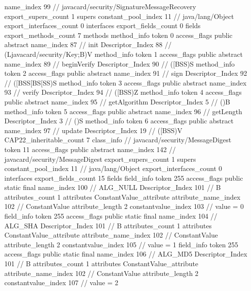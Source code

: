 {{{			name_index	99		// javacard/security/SignatureMessageRecovery
			export_supers_count	1
			supers {
				constant_pool_index	11		// java/lang/Object
			}
			export_interfaces_count	0
			interfaces {
			}
			export_fields_count	0
			fields {
			}
			export_methods_count	7
			methods {
				method_info {
					token	0
					access_flags	public abstract
					name_index	87		// init
					Descriptor_Index	88		// (Ljavacard/security/Key;B)V
				}
				method_info {
					token	1
					access_flags	public abstract
					name_index	89		// beginVerify
					Descriptor_Index	90		// ([BSS)S
				}
				method_info {
					token	2
					access_flags	public abstract
					name_index	91		// sign
					Descriptor_Index	92		// ([BSS[BS[SS)S
				}
				method_info {
					token	3
					access_flags	public abstract
					name_index	93		// verify
					Descriptor_Index	94		// ([BSS)Z
				}
				method_info {
					token	4
					access_flags	public abstract
					name_index	95		// getAlgorithm
					Descriptor_Index	5		// ()B
				}
				method_info {
					token	5
					access_flags	public abstract
					name_index	96		// getLength
					Descriptor_Index	3		// ()S
				}
				method_info {
					token	6
					access_flags	public abstract
					name_index	97		// update
					Descriptor_Index	19		// ([BSS)V
				}
			}
			CAP22_inheritable_count	7
		}
		class_info {		// javacard/security/MessageDigest
			token	11
			access_flags	public abstract
			name_index	142		// javacard/security/MessageDigest
			export_supers_count	1
			supers {
				constant_pool_index	11		// java/lang/Object
			}
			export_interfaces_count	0
			interfaces {
			}
			export_fields_count	15
			fields {
			field_info {
				token	255
				access_flags	public static final
				name_index	100		// ALG_NULL
				Descriptor_Index	101		// B
				attributes_count	1
				attributes {
				ConstantValue_attribute {
					attribute_name_index	102		// ConstantValue
					attribute_length	2
					constantvalue_index	103		// value = 0
				}
				}
			}
			field_info {
				token	255
				access_flags	public static final
				name_index	104		// ALG_SHA
				Descriptor_Index	101		// B
				attributes_count	1
				attributes {
				ConstantValue_attribute {
					attribute_name_index	102		// ConstantValue
					attribute_length	2
					constantvalue_index	105		// value = 1
				}
				}
			}
			field_info {
				token	255
				access_flags	public static final
				name_index	106		// ALG_MD5
				Descriptor_Index	101		// B
				attributes_count	1
				attributes {
				ConstantValue_attribute {
					attribute_name_index	102		// ConstantValue
					attribute_length	2
					constantvalue_index	107		// value = 2
}}}}}}}
